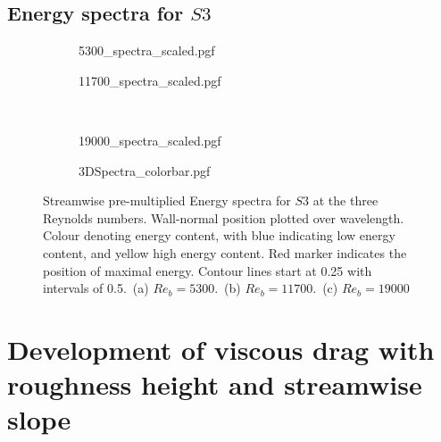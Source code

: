 \section{Energy spectra for $S3$}
\begin{figure}[h!]
    \centering
    \begin{subfigure}{0.495\textwidth}
        \subcaption{}
        {5300_spectra_scaled.pgf}
        \label{subfig: 5300 spectra scaled reyndolsComp}
    \end{subfigure}
    \hfill
        \begin{subfigure}{0.495\textwidth}
            \subcaption{}
            {11700_spectra_scaled.pgf}
            \label{subfig: 11700 spectra scaled reynoldsComp}
    \end{subfigure}
    \\[-20pt]
    \begin{subfigure}{0.495\textwidth}
        \subcaption{}
        {19000_spectra_scaled.pgf}
        \label{subfig: 19000 spectra scaled reynoldsComp}
    \end{subfigure}
    \centering
    \begin{subfigure}{\textwidth}
        \centering
        \hspace{0.9cm}
        {3DSpectra_colorbar.pgf}
    \end{subfigure}
    \caption[Streamwise pre-multiplied energy spectra for $S3$]{Streamwise pre-multiplied Energy spectra for $S3$ at the three Reynolds numbers. Wall-normal position plotted over wavelength. Colour denoting energy content, with blue indicating low energy content, and yellow high energy content. Red marker indicates the position of maximal energy. Contour lines start at 0.25 with intervals of 0.5.~(a) $Re_b = 5300$.~(b) $Re_b = 11700$.~(c) $Re_b = 19000$}
    \label{fig: energy spectra S3}
\end{figure}



\chapter{Development of viscous drag with roughness height and streamwise slope}\label{apx: viscous drag to surface height}

